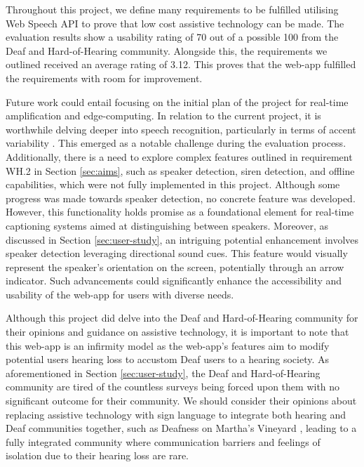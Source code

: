\documentclass{l4proj}
\begin{document}
Throughout this project, we define many requirements to be fulfilled utilising Web Speech API to prove that low cost assistive technology can be made. The evaluation results show a usability rating of 70 out of a possible 100 from the Deaf and Hard-of-Hearing community. Alongside this, the requirements we outlined received an average rating of 3.12. This proves that the web-app fulfilled the requirements with room for improvement. 

Future work could entail focusing on the initial plan of the project for real-time amplification and edge-computing. In relation to the current project, it is worthwhile delving deeper into speech recognition, particularly in terms of accent variability \citep{Lopez-Lloreda_2020, koenecke2020racial}. This emerged as a notable challenge during the evaluation process. Additionally, there is a need to explore complex features outlined in requirement WH.2 in Section \ref{sec:aims}, such as speaker detection, siren detection, and offline capabilities, which were not fully implemented in this project. Although some progress was made towards speaker detection, no concrete feature was developed. However, this functionality holds promise as a foundational element for real-time captioning systems aimed at distinguishing between speakers. Moreover, as discussed in Section \ref{sec:user-study}, an intriguing potential enhancement involves speaker detection leveraging directional sound cues. This feature would visually represent the speaker's orientation on the screen, potentially through an arrow indicator. Such advancements could significantly enhance the accessibility and usability of the web-app for users with diverse needs.

Although this project did delve into the Deaf and Hard-of-Hearing community for their opinions and guidance on assistive technology, it is important to note that this web-app is an infirmity model as the web-app's features aim to modify potential users hearing loss to accustom Deaf users to a hearing society. As aforementioned in Section \ref{sec:user-study}, the Deaf and Hard-of-Hearing community are tired of the countless surveys being forced upon them with no significant outcome for their community. We should consider their opinions about replacing assistive technology with sign language to integrate both hearing and Deaf communities together, such as Deafness on Martha’s Vineyard \citep{Groce_2016}, leading to a fully integrated community where communication barriers and feelings of isolation due to their hearing loss are rare.
\end{document}
